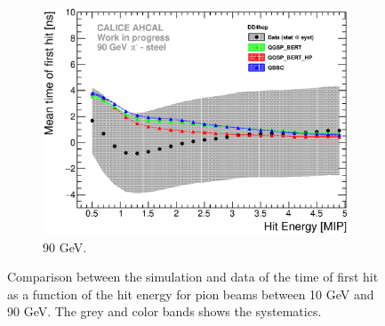 \begin{figure}[htbp!]
\begin{subfigure}[t]{0.49\textwidth}
    \centering
    \includegraphics[width=1\textwidth]{../Thesis_Plots/Timing/Pions/Plots/ComparisonToSim/Time_Energy_90GeV_DD4hep.eps}
    \caption{90 GeV.} \label{fig:Energy_SimData_90GeV_DD4hep}
  \end{subfigure}
  \caption{Comparison between the \ddhep simulation and data of the time of first hit as a function of the hit energy for pion beams between 10 GeV and 90 GeV. The grey and color bands shows the systematics.}
\end{figure}


